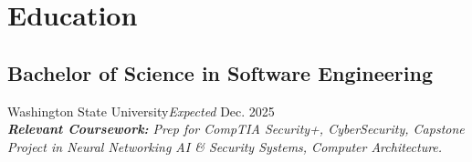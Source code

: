 \section{Education}
\subsection{Bachelor of Science in Software Engineering}{Washington State University}{\textit{Expected} Dec. 2025}
\\ \textit{\textbf{Relevant Coursework:} Prep for CompTIA Security+, CyberSecurity, Capstone Project in Neural Networking AI & Security Systems, Computer Architecture.}
\vspace{0.2em}
